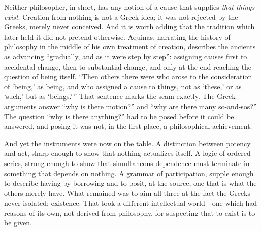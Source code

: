 Neither philosopher, in short, has any notion of a cause that supplies \emph{that things exist}. Creation from nothing is not a Greek idea; it was not rejected by the Greeks, merely never conceived. And it is worth adding that the tradition which later held it did not pretend otherwise. Aquinas, narrating the history of philosophy in the middle of his own treatment of creation, describes the ancients as advancing ``gradually, and as it were step by step'': assigning causes first to accidental change, then to substantial change, and only at the end reaching the question of being itself. ``Then others there were who arose to the consideration of `being,' as being, and who assigned a cause to things, not as `these,' or as `such,' but as `beings.'\,'' That sentence marks the seam exactly. The Greek arguments answer ``why is there motion?'' and ``why are there many so-and-sos?'' The question ``why is there anything?'' had to be posed before it could be answered, and posing it was not, in the first place, a philosophical achievement.

And yet the instruments were now on the table. A distinction between potency and act, sharp enough to show that nothing actualizes itself. A logic of ordered series, strong enough to show that simultaneous dependence must terminate in something that depends on nothing. A grammar of participation, supple enough to describe having-by-borrowing and to posit, at the source, one that is what the others merely have. What remained was to aim all three at the fact the Greeks never isolated: existence. That took a different intellectual world---one which had reasons of its own, not derived from philosophy, for suspecting that to exist is to be given.
